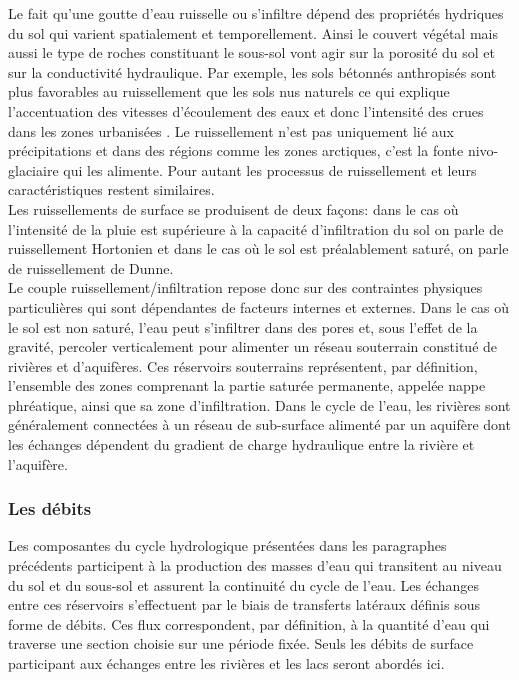 Le fait qu'une goutte d'eau ruisselle ou s'infiltre dépend des propriétés hydriques du sol qui varient spatialement et temporellement. Ainsi le couvert végétal mais aussi le type de roches constituant le sous-sol vont agir sur la porosité du sol et sur la conductivité hydraulique. Par exemple, les sols bétonnés anthropisés sont plus favorables au ruissellement que les sols nus naturels ce qui explique l'accentuation des vitesses d'écoulement des eaux et donc l'intensité des crues dans les zones urbanisées \citep{nirupama2007,fox2012}. Le ruissellement n'est pas uniquement lié aux précipitations et dans des régions comme les zones arctiques, c'est la fonte nivo-glaciaire qui les alimente. Pour autant les processus de ruissellement et leurs caractéristiques restent similaires.\\
Les ruissellements de surface se produisent de deux façons: dans le cas où l'intensité de la pluie est supérieure à la capacité d'infiltration du sol on parle de ruissellement Hortonien et dans le cas où le sol est préalablement saturé, on parle de ruissellement de Dunne.\\
Le couple ruissellement/infiltration repose donc sur des contraintes physiques particulières qui sont dépendantes de facteurs internes et externes. 
Dans le cas où le sol est non saturé, l'eau peut s'infiltrer dans des pores et, sous l'effet de la gravité, percoler verticalement pour alimenter un réseau souterrain constitué de rivières et d'aquifères. Ces réservoirs souterrains représentent, par définition, l'ensemble des zones comprenant la partie saturée permanente, appelée nappe phréatique, ainsi que sa zone d'infiltration. Dans le cycle de l'eau, les rivières sont généralement connectées à un réseau de sub-surface alimenté par un aquifère dont les échanges dépendent du gradient de charge hydraulique entre la rivière et l'aquifère.

\subsubsection{{\selectfont Les débits}}

Les composantes du cycle hydrologique présentées dans les paragraphes précédents participent à la production des masses d'eau qui transitent au niveau du sol et du sous-sol et assurent la continuité du cycle de l'eau. Les échanges entre ces réservoirs s'effectuent par le biais de transferts latéraux définis sous forme de débits. Ces flux correspondent, par définition, à la quantité d'eau qui traverse une section choisie sur une période fixée. Seuls les débits de surface participant aux échanges entre les rivières et les lacs seront abordés ici.\\

